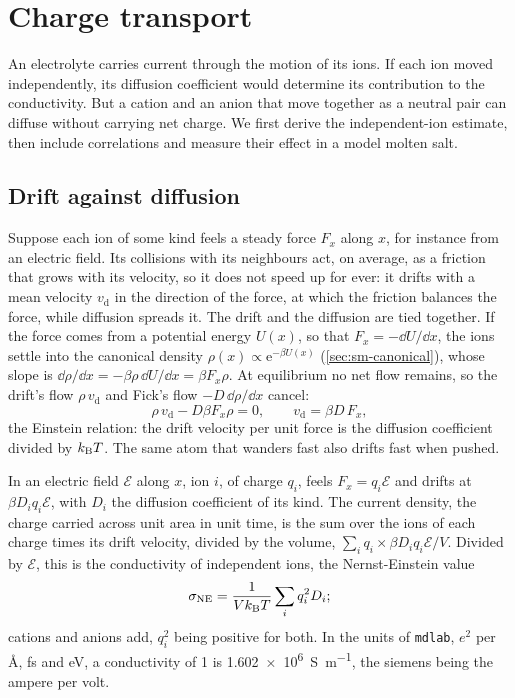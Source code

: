 \section{Charge transport}
\label{sec:ob-charge}

An electrolyte carries current through the motion of its ions. If each
ion moved independently, its diffusion coefficient would determine its
contribution to the conductivity. But a cation and an anion that move
together as a neutral pair can diffuse without carrying net charge.
We first derive the independent-ion estimate, then include correlations
and measure their effect in a model molten salt.

\subsection*{Drift against diffusion}

Suppose each ion of some kind feels a steady force $F_x$ along $x$, for
instance from an electric field. Its collisions with its neighbours act,
on average, as a friction that grows with its velocity, so it does not
speed up for ever: it drifts with a mean velocity $v_{\mathrm d}$ in the
direction of the force, at which the friction balances the force, while
diffusion spreads it. The drift and the diffusion are tied together. If
the force comes from a potential energy $U(x)$, so that $F_x = -\dd U/\dd
x$, the ions settle into the canonical density $\rho(x) \propto
\mathrm{e}^{-\beta U(x)}$ (\cref{sec:sm-canonical}), whose slope is
$\dd\rho/\dd x = -\beta\rho\,\dd U/\dd x = \beta F_x\rho$. At equilibrium no
net flow remains, so the drift's flow $\rho\,v_{\mathrm d}$ and Fick's flow
$-D\,\dd\rho/\dd x$ cancel:
\begin{equation*}
   \rho\,v_{\mathrm d} - D\beta F_x\rho = 0 , \qquad
   v_{\mathrm d} = \beta D\,F_x ,
\end{equation*}
the Einstein relation: the drift velocity per unit force is the
diffusion coefficient divided by $k_{\mathrm{B}} T$. The same atom that wanders
fast also drifts fast when pushed.

In an electric field $\mathcal{E}$ along $x$, ion $i$, of charge $q_i$,
feels $F_x = q_i\mathcal{E}$ and drifts at $\beta D_iq_i\mathcal{E}$, with
$D_i$ the diffusion coefficient of its kind. The current density, the
charge carried across unit area in unit time, is the sum over the ions of
each charge times its drift velocity, divided by the volume, $\sum_iq_i
\times \beta D_iq_i\mathcal{E}/V$. Divided by $\mathcal{E}$, this is the
conductivity of independent ions, the Nernst-Einstein value
\begin{equation}
   \sigma_{\mathrm{NE}} = \frac{1}{Vk_{\mathrm{B}} T}\sum_iq_i^2D_i ;
   \label{eq:ob-ne}
\end{equation}
cations and anions add, $q_i^2$ being positive for both. In the units of
\texttt{mdlab}, $e^2$ per \si{\angstrom}, \si{\femto\second} and
\si{\electronvolt}, a conductivity of 1 is \SI{1.602e6}{\siemens\per\metre},
the siemens being the ampere per volt.

